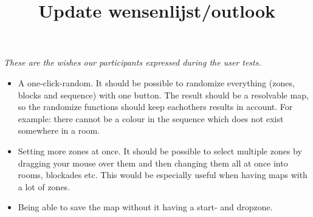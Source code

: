 \documentclass{article}
\title{Update wensenlijst/outlook}
\begin{document}
\maketitle

\textit{These are the wishes our participants expressed during the user tests.}
\\
\begin{itemize}
\item A one-click-random. It should be possible to randomize everything (zones, blocks and sequence) with one button. The result should be a resolvable map, so the randomize functions should keep eachothers results in account. For example: there cannot be a colour in the sequence which does not exist somewhere in a room.
\item Setting more zones at once. It should be possible to select multiple zones by dragging your mouse over them and then changing them all at once into rooms, blockades etc. This would be especially useful when having maps with a lot of zones. 
\item Being able to save the map without it having a start- and dropzone. 
\end{itemize}
\end{document}
